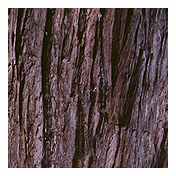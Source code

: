 \begin{figure}[]
\begin{subfigure}{\textwidth}
        \begin{subfigure}{0.19\textwidth}
            \centering
            \includegraphics[width=\textwidth]{images/04-experiment03/staircase_wood_target.jpg}
        \end{subfigure}
        \hfill
        \begin{subfigure}{0.19\textwidth}
            \centering
\end{subfigure}
\end{subfigure}
\end{figure}
